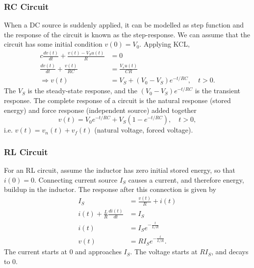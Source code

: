 \documentclass{article}
\begin{document}
\subsubsection{RC Circuit}
When a DC source is suddenly applied, it can be modelled as step function and the response of the circuit is known as the step-response. We can assume that the circuit has some initial condition $v(0)=V_0$. Applying KCL,
\begin{align*}
    c \frac{d v(t)}{d t}+\frac{v(t)-V_Su(t)}{R} &= 0\\
    \frac{d v(t)}{d t}+\frac{v(t)}{RC}&=\frac{V_su(t)}{CR}\\
    \Rightarrow v(t)&=V_S+(V_0-V_S)e^{-t/RC},\quad t>0.
\end{align*}
The $V_S$ is the steady-state response, and the $(V_0-V_S)e^{-t/RC}$ is the transient response. The complete response of a circuit is the natural response (stored energy) and force response (independent source) added together 
\[
    v(t)=V_0e^{-t/RC}+V_S(1-e^{-t/RC}), \quad t>0,
\]
i.e. $v(t)=v_n(t)+v_f(t)$ (natural voltage, forced voltage).

\subsubsection{RL Circuit}
For an RL circuit, assume the inductor has zero initial stored energy, so that $i(0)=0$. Connecting current source $I_S$ causes a current, and therefore energy, buildup in the inductor. The response after this connection is given by
\begin{align*}
    I_S &= \frac{v(t)}{R}+i(t)\\
    i(t)+\frac{L}{R}\frac{d i(t)}{d t}&= I_S\\
    i(t)&=I_Se^{-\frac{t}{L/R}}\\
    v(t)&=RI_Se^{-\frac{t}{L/R}}.
\end{align*}
The current starts at $0$ and approaches $I_S$. The voltage starts at $RI_S$, and decays to 0.
\end{document}
